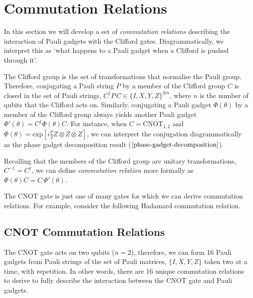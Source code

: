 \section{Commutation Relations}%
\label{commutation-relations}

In this section we will develop a set of \textit{commutation relations} describing the interaction of Pauli gadgets with the Clifford gates. Diagrammatically, we interpret this as `what happens to a Pauli gadget when a Clifford is pushed through it'.

The Clifford group is the set of transformations that normalise the Pauli group. Therefore, conjugating a Pauli string $P$ by a member of the Clifford group $C$ is closed in the set of Pauli strings, $C^\dagger P \, C \in \{I, X, Y, Z\}^{\otimes n}$, where $n$ is the number of qubits that the Clifford acts on. Similarly, conjugating a Pauli gadget $\Phi(\theta)$ by a member of the Clifford group always yields another Pauli gadget $\Phi'(\theta) = C^\dagger \Phi(\theta) C$. For instance, when $C = \text{CNOT}_{1, 2}$ and $\Phi(\theta) = \text{exp} \left[ i\frac{\theta}{2} Z \otimes Z \otimes Z \right]$, we can interpret the conjugation diagrammatically as the phase gadget decomposition result ($\ref{phase-gadget-decomposition}$).


Recalling that the members of the Clifford group are unitary transformations, $C^{-1} = C^\dagger$, we can define \textit{commutation relation} more formally as $\Phi(\theta) C = C \, \Phi'(\theta)$.


The CNOT gate is just one of many gates for which we can derive commutation relations. For example, consider the following Hadamard commutation relation.



\subsection{CNOT Commutation Relations}

The CNOT gate acts on two qubits ($n = 2$), therefore, we can form 16 Pauli gadgets from Pauli strings of the set of Pauli matrices, $\{I, X, Y, Z\}$ taken two at a time, with repetition. In other words, there are 16 unique commutation relations to derive to fully describe the interaction between the CNOT gate and Pauli gadgets.

